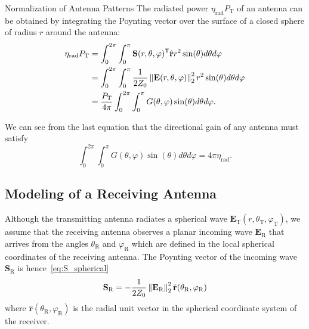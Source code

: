 \begin{highlightbox}{Normalization of Antenna Patterns}
    The radiated power $\eta_\text{rad} P_\text{T}$ of an antenna can be obtained by integrating the Poynting vector over the surface of a closed sphere of radius $r$ around the antenna:
    \begin{align}
        \eta_\text{rad} P_\text{T} &=  \int_0^{2\pi}\int_0^{\pi} \mathbf{S}(r, \theta, \varphi)^\mathsf{T} \hat{\mathbf{r}} r^2 \sin(\theta)d\theta d\varphi \\
                        &= \int_0^{2\pi}\int_0^{\pi} \frac{1}{2Z_0} \left\lVert\mathbf{E}(r, \theta, \varphi)\right\rVert_2^2 r^2\sin(\theta)d\theta d\varphi \\
                        &= \frac{P_\text{T}}{4 \pi} \int_0^{2\pi}\int_0^{\pi} G(\theta, \varphi) \sin(\theta)d\theta d\varphi.
    \end{align}

    We can see from the last equation that the directional gain of any antenna must satisfy
    \begin{equation}
        \int_0^{2\pi}\int_0^{\pi} G(\theta, \varphi) \sin(\theta)d\theta d\varphi = 4 \pi \eta_\text{rad}.
    \end{equation}
\end{highlightbox}

\subsection{Modeling of a Receiving Antenna}

Although the transmitting antenna radiates a spherical wave $\mathbf{E}_\text{T}(r,\theta_\text{T},\varphi_\text{T})$, we assume that the receiving antenna observes a planar incoming wave $\mathbf{E}_\text{R}$ that arrives from the angles $\theta_\text{R}$ and $\varphi_\text{R}$ which are defined in the local spherical coordinates of the receiving antenna. The Poynting vector of the incoming wave $\mathbf{S}_\text{R}$ is hence~\eqref{eq:S_spherical}
\begin{equation}
    \label{eq:S_R}
    \mathbf{S}_\text{R} = -\frac{1}{2Z_0} \left\lVert\mathbf{E}_\text{R}\right\rVert_2^2 \hat{\mathbf{r}}(\theta_\text{R}, \varphi_\text{R})
\end{equation}
where $\hat{\mathbf{r}}(\theta_\text{R}, \varphi_\text{R})$ is the radial unit vector in the spherical coordinate system of the receiver.

